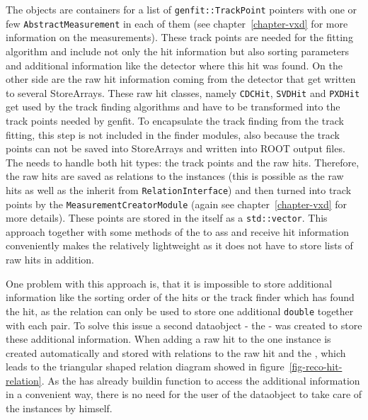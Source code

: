 The \Track objects are containers for a list of \texttt{genfit::TrackPoint} pointers with one or few \texttt{AbstractMeasurement} in each of them (see chapter~\ref{chapter-vxd} for more information on the measurements). These track points are needed for the fitting algorithm and include not only the hit information but also sorting parameters and additional information like the detector where this hit was found. On the other side are the raw hit information coming from the detector that get written to several StoreArrays. These raw hit classes, namely \texttt{CDCHit}, \texttt{SVDHit} and \texttt{PXDHit} get used by the track finding algorithms and have to be transformed into the track points needed by genfit. To encapsulate the track finding from the track fitting, this step is not included in the finder modules, also because the track points can not be saved into StoreArrays and written into ROOT output files. The \RecoTrack needs to handle both hit types: the track points and the raw hits. Therefore, the raw hits are saved as relations to the \RecoTrack instances (this is possible as the raw hits as well as the \RecoTrack inherit from \texttt{RelationInterface}) and then turned into track points by the \texttt{MeasurementCreatorModule} (again see chapter~\ref{chapter-vxd} for more details). These points are stored in the \RecoTrack itself as a \texttt{std::vector}. This approach together with some methods of the \RecoTrack to ass and receive hit information conveniently makes the \RecoTrack relatively lightweight as it does not have to store lists of raw hits in addition.

One problem with this approach is, that it is impossible to store additional information like the sorting order of the hits or the track finder which has found the hit, as the relation can only be used to store one additional \texttt{double} together with each pair. To solve this issue a second dataobject - the \Hit - was created to store these additional information. When adding a raw hit to the \RecoTrack one \Hit instance is created automatically and stored with relations to the raw hit and the \RecoTrack, which leads to the triangular shaped relation diagram showed in figure~\ref{fig-reco-hit-relation}. As the \RecoTrack has already buildin function to access the additional information in a convenient way, there is no need for the user of the dataobject to take care of the \Hit instances by himself. 

